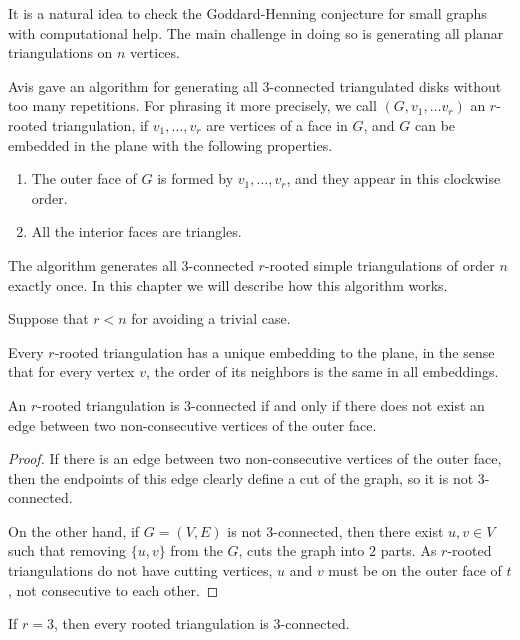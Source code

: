 It is a natural idea to check the Goddard-Henning conjecture for small graphs with
computational help. The main challenge in doing so is generating all planar triangulations
on $n$ vertices.

Avis \cite{algorithm} gave an algorithm for generating all $3$-connected triangulated disks without
too many repetitions. For phrasing it more precisely, we call $(G, v_1, \dots v_r)$
an $r$-rooted triangulation, if $v_1, \dots, v_r$ are vertices of a face in $G$, and $G$
can be embedded in the plane with the following properties.

\begin{enumerate}
  \item The outer face of $G$ is formed by $v_1, \dots, v_r$, and they appear in
  this clockwise order.
  \item All the interior faces are triangles.
\end{enumerate}

The algorithm generates all $3$-connected $r$-rooted simple triangulations of order $n$ exactly once.
In this chapter we will describe how this algorithm works.

Suppose that $r < n$ for avoiding a trivial case.

\begin{remark}
  Every $r$-rooted triangulation has a unique embedding to the plane, in the sense that
  for every vertex $v$, the order of its neighbors is the same in all embeddings.
\end{remark}

\begin{claim} \label{c:3conn}
  An $r$-rooted triangulation is $3$-connected if and only if there does not exist
  an edge between two non-consecutive vertices of the outer face.
\end{claim}
\begin{proof}
  If there is an edge between two non-consecutive vertices of the outer face, then
  the endpoints of this edge clearly define a cut of the graph, so it is not $3$-connected.

  On the other hand, if $G = (V, E)$ is not $3$-connected, then there exist $u, v \in V$ such that
  removing $\{u, v\}$ from the $G$, cuts the graph into $2$ parts. As $r$-rooted triangulations
  do not have cutting vertices, $u$ and $v$ must be on the outer face of $t$, not consecutive
  to each other.
\end{proof}

\begin{cor}
  If $r = 3$, then every rooted triangulation is $3$-connected.
\end{cor}

